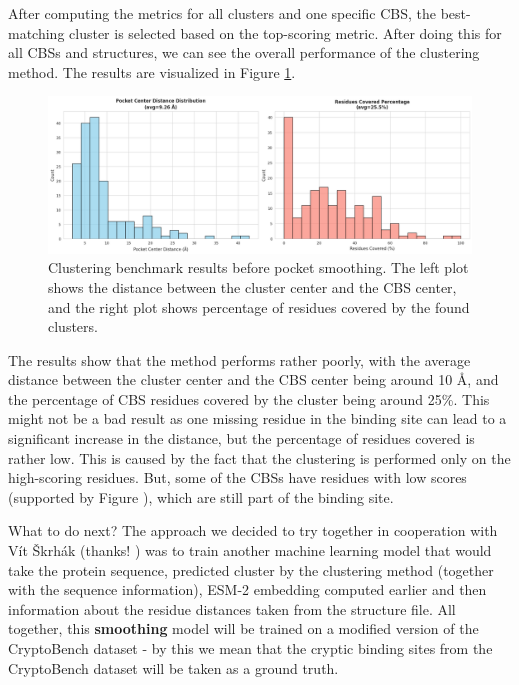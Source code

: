 After computing the metrics for all clusters and one specific CBS, the best-matching cluster is selected based on the top-scoring metric. After doing this for all CBSs and structures, we can see the overall performance of the clustering method. The results are visualized in Figure \ref{fig:clustering-benchmark}.

\begin{figure}[htbp]
    \centering
    \includegraphics[width=\textwidth]{img/non-smoothened-1.png}
    \caption{Clustering benchmark results before pocket smoothing. The left plot shows the distance between the cluster center and the CBS center, and the right plot shows percentage of residues covered by the found clusters.}
    \label{fig:clustering-benchmark}
\end{figure}

The results show that the method performs rather poorly, with the average distance between the cluster center and the CBS center being around 10 \AA, and the percentage of CBS residues covered by the cluster being around 25\%. This might not be a bad result as one missing residue in the binding site can lead to a significant increase in the distance, but the percentage of residues covered is rather low. This is caused by the fact that the clustering is performed only on the high-scoring residues. But, some of the CBSs have residues with low scores (supported by Figure ), which are still part of the binding site.

What to do next? The approach we decided to try together in cooperation with Vít Škrhák (thanks! ) was to train another machine learning model that would take the protein sequence, predicted cluster by the clustering method (together with the sequence information), ESM-2 embedding computed earlier and then information about the residue distances taken from the structure file. All together, this \textbf{smoothing} model will be trained on a modified version of the CryptoBench dataset - by this we mean that the cryptic binding sites from the CryptoBench dataset will be taken as a ground truth.

